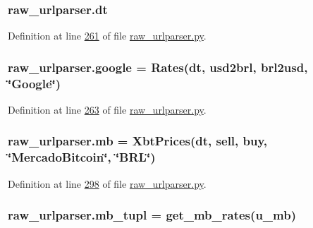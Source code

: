 \subsubsection[{\texorpdfstring{dt}{dt}}]{\setlength{\rightskip}{0pt plus 5cm}raw\+\_\+urlparser.\+dt}\hypertarget{namespaceraw__urlparser_acbaf2eef75f4aa43e1f6659c0fd34836}{}\label{namespaceraw__urlparser_acbaf2eef75f4aa43e1f6659c0fd34836}


Definition at line \hyperlink{raw__urlparser_8py_source_l00261}{261} of file \hyperlink{raw__urlparser_8py_source}{raw\+\_\+urlparser.\+py}.

\subsubsection[{\texorpdfstring{google}{google}}]{\setlength{\rightskip}{0pt plus 5cm}raw\+\_\+urlparser.\+google = {\bf Rates}({\bf dt}, {\bf usd2brl}, {\bf brl2usd}, \char`\"{}Google\char`\"{})}\hypertarget{namespaceraw__urlparser_a1b812abf4fbbd8478dca91446c66b646}{}\label{namespaceraw__urlparser_a1b812abf4fbbd8478dca91446c66b646}


Definition at line \hyperlink{raw__urlparser_8py_source_l00263}{263} of file \hyperlink{raw__urlparser_8py_source}{raw\+\_\+urlparser.\+py}.

\subsubsection[{\texorpdfstring{mb}{mb}}]{\setlength{\rightskip}{0pt plus 5cm}raw\+\_\+urlparser.\+mb = {\bf Xbt\+Prices}({\bf dt}, {\bf sell}, {\bf buy}, \char`\"{}Mercado\+Bitcoin\char`\"{}, \char`\"{}B\+RL\char`\"{})}\hypertarget{namespaceraw__urlparser_a76acf8d303c15079b0560eace3e9720f}{}\label{namespaceraw__urlparser_a76acf8d303c15079b0560eace3e9720f}


Definition at line \hyperlink{raw__urlparser_8py_source_l00298}{298} of file \hyperlink{raw__urlparser_8py_source}{raw\+\_\+urlparser.\+py}.

\subsubsection[{\texorpdfstring{mb\+\_\+tupl}{mb_tupl}}]{\setlength{\rightskip}{0pt plus 5cm}raw\+\_\+urlparser.\+mb\+\_\+tupl = {\bf get\+\_\+mb\+\_\+rates}({\bf u\+\_\+mb})}\hypertarget{namespaceraw__urlparser_a5d09c5bd4390610ba67d1278a9c66b88}{}\label{namespaceraw__urlparser_a5d09c5bd4390610ba67d1278a9c66b88}


